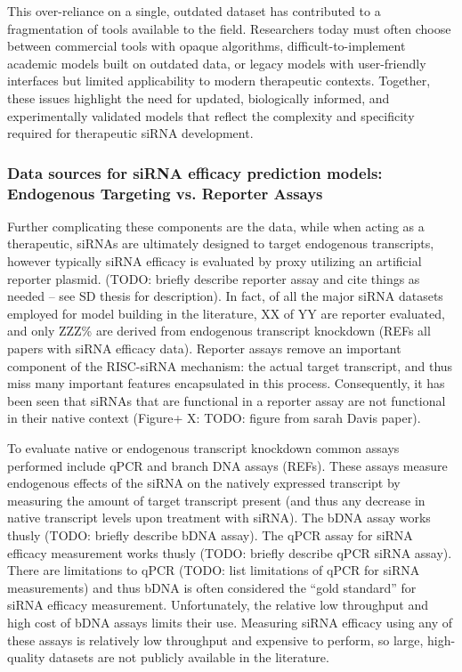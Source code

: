 \documentclass{report}
\begin{document}
This over-reliance on a single, outdated dataset has contributed to a fragmentation of tools available to the field. Researchers today must often choose between commercial tools with opaque algorithms, difficult-to-implement academic models built on outdated data, or legacy models with user-friendly interfaces but limited applicability to modern therapeutic contexts. Together, these issues highlight the need for updated, biologically informed, and experimentally validated models that reflect the complexity and specificity required for therapeutic siRNA development.


\subsubsection{Data sources for siRNA efficacy prediction models:  Endogenous Targeting vs. Reporter Assays}

Further complicating these components are the data, while when acting as a therapeutic, siRNAs are ultimately designed to target endogenous transcripts, however typically siRNA efficacy is evaluated by proxy utilizing an artificial reporter plasmid. (TODO: briefly describe reporter assay and cite things as needed – see SD thesis for description). In fact, of all the major siRNA datasets employed for model building in the literature, XX of YY are reporter evaluated, and only ZZZ\% are derived from endogenous transcript knockdown (REFs all papers with siRNA efficacy data). Reporter assays remove an important component of the RISC-siRNA mechanism: the actual target transcript, and thus miss many important features encapsulated in this process. Consequently, it has been seen that siRNAs that are functional in a reporter assay are not functional in their native context (Figure+ X: TODO: figure from sarah Davis paper). 

To evaluate native or endogenous transcript knockdown common assays performed include qPCR and branch DNA assays (REFs). These assays measure endogenous effects of the siRNA on the natively expressed transcript by measuring the amount of target transcript present (and thus any decrease in native transcript levels upon treatment with siRNA). The bDNA assay works thusly (TODO: briefly describe bDNA assay). The qPCR assay for siRNA efficacy measurement works thusly (TODO: briefly describe qPCR siRNA assay). There are limitations to qPCR (TODO: list limitations of qPCR for siRNA measurements) and thus bDNA is often considered the “gold standard” for siRNA efficacy measurement. Unfortunately, the relative low throughput and high cost of bDNA assays limits their use. Measuring siRNA efficacy using any of these assays is relatively low throughput and expensive to perform, so large, high-quality datasets are not publicly available in the literature. 
\end{document}
